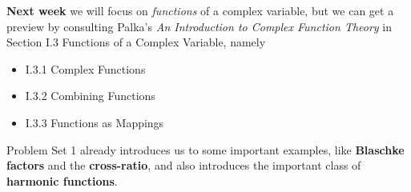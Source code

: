 \documentclass{homework}
\begin{document}
\textbf{Next week} we will focus on \textit{functions} of a complex
variable, but we can get a preview by consulting Palka's \textit{An
  Introduction to Complex Function Theory} in Section I.3 Functions of
a Complex Variable, namely
\begin{itemize}
\item I.3.1 Complex Functions
\item I.3.2 Combining Functions
\item I.3.3 Functions as Mappings
\end{itemize}
Problem Set 1 already introduces us to some important examples, like
\textbf{Blaschke factors} and the \textbf{cross-ratio}, and also
introduces the important class of \textbf{harmonic functions}.
\end{document}
